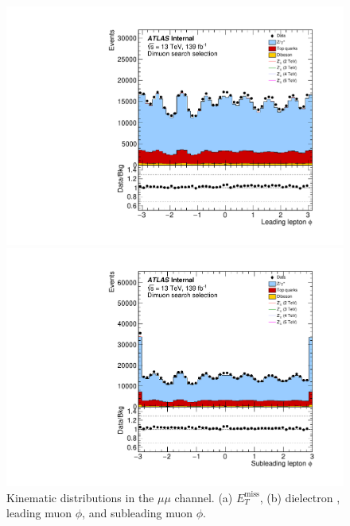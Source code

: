 \begin{figure}[h!]
\begin{minipage}[b]{.45\linewidth}
    \includegraphics[width=1\textwidth]{figures/ci/dataMc/stacks_mc16e_2015-2018_uu_phi1.pdf}
    \subcaption{}
\end{minipage}
\begin{minipage}[b]{.45\linewidth}
    \includegraphics[width=1\textwidth]{figures/ci/dataMc/stacks_mc16e_2015-2018_uu_phi2.pdf}
    \subcaption{}
\end{minipage}
\caption{Kinematic distributions in the $\mu\mu$ channel. (a) $E_T^\text{miss}$, (b) dielectron \pt, leading muon $\phi$, and subleading muon $\phi$.}
\label{fig:}
\end{figure}

